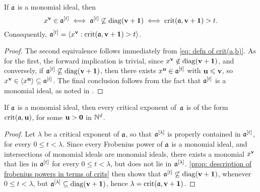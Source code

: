 \documentclass[11pt]{amsart}
\begin{document}
\begin{proposition}\label{prop: description of frobenius powers in terms of crits}
   If $\mathfrak{a}$ is a monomial ideal, then
   \[ x^{\mathbf{v}} \in \mathfrak{a}^{[t]} \iff \mathfrak{a}^{[t]} \not \subseteq \operatorname{diag}(\mathbf{v}+\mathbf{1}) \iff \operatorname{crit}(\mathfrak{a}, \mathbf{v}+\mathbf{1}) > t.\]
   Consequently, $\mathfrak{a}^{[t]} = \langle x^{\mathbf{v}} : \operatorname{crit}(\mathfrak{a}, \mathbf{v}+\mathbf{1}) > t \rangle$.
\end{proposition}

\begin{proof}
   The second equivalence follows immediately from \eqref{eq: defn of crit(a,b)}.
   As for the first, the forward implication is trivial, since $x^{\mathbf{v}} \notin\operatorname{diag}(\mathbf{v}+\mathbf{1})$, and conversely, if $\mathfrak{a}^{[t]} \not \subseteq \operatorname{diag}(\mathbf{v}+\mathbf{1})$, then there exists $x^{\mathbf{u}} \in \mathfrak{a}^{[t]}$ with $\mathbf{u} \leqslant \mathbf{v}$, so $x^{\mathbf{v}}\in \langle x^{\mathbf{u}} \rangle \subseteq \mathfrak{a}^{[t]}$.
   The final conclusion follows from the fact that $\mathfrak{a}^{[t]}$ is a monomial ideal, as noted in .
\end{proof}

\begin{corollary}
   If $\mathfrak{a}$ is a monomial ideal, then every critical exponent of~$\mathfrak{a}$ is of the form $\operatorname{crit}(\mathfrak{a},\mathbf{u})$, for some $\mathbf{u} > \mathbf{0}$ in $\mathbb{N}^d$.
\end{corollary}

\begin{proof}
   Let $\lambda$ be a critical exponent of $\mathfrak{a}$, so that $\mathfrak{a}^{[\lambda]}$ is properly contained in $\mathfrak{a}^{[t]}$, for every $0 \le t <\lambda$.
   Since every Frobenius power of $\mathfrak{a}$ is a monomial ideal, and intersections of monomial ideals are monomial ideals, there exists a monomial $x^{\mathbf{v}}$ that lies in $\mathfrak{a}^{[t]}$ for every $0\le t < \lambda$, but does not lie in $\mathfrak{a}^{[\lambda]}$.
    
   \cref{prop: description of frobenius powers in terms of crits} then shows that $\mathfrak{a}^{[t]}\not\subseteq \operatorname{diag}(\mathbf{v}+\mathbf{1})$, whenever $0\le t < \lambda$, but $\mathfrak{a}^{[\lambda]} \subseteq \operatorname{diag}(\mathbf{v}+\mathbf{1})$, hence $\lambda = \operatorname{crit}(\mathfrak{a},\mathbf{v}+\mathbf{1})$.
\end{proof}
\end{document}
